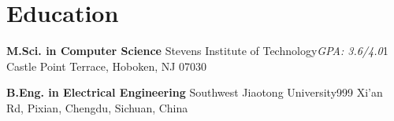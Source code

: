 \documentclass[12pt,letterpaper,sans]{moderncv}        %
\begin{document}
\section{Education}
{\textbf{M.Sci. in Computer Science}}
{Stevens Institute of Technology}{}{\textit{GPA: 3.6/4.0}}{1 Castle Point Terrace, Hoboken, NJ 07030
}  %

\vspace*{0.5cm}
{\textbf{B.Eng. in Electrical Engineering}}
{Southwest Jiaotong University}{}{}{999 Xi'an Rd, Pixian, Chengdu, Sichuan, China}
\end{document}
